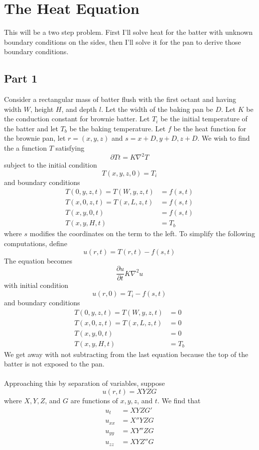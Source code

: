 \documentclass[12pt]{reedmcm}
\begin{document}
\section{The Heat Equation}
This will be a two step problem.  First I'll solve heat for the batter with unknown boundary conditions on the sides, then I'll solve it for the pan to derive those boundary conditions.

\subsection{Part 1} 
Consider a rectangular mass of batter flush with the first octant and having width $W$, height $H$, and depth $l$.  Let the width of the baking pan be $D$.  Let $K$ be the conduction constant for brownie batter.  Let $T_i$ be the initial temperature of the batter and let $T_b$ be the baking temperature.  Let $f$ be the heat function for the brownie pan, let $r = (x,y,z)$ and $s = x+D,y+D,z+D$.   We wish to find the a function $T$ satisfying
\[\partial{T}{t} = K \nabla^2 T\]
subject to the initial condition
\[T(x,y,z,0) = T_i\]
and boundary conditions \begin{align*}
T(0,y,z,t) = T(W,y,z,t) &= f(s,t)\\
T(x,0,z,t) = T(x,L,z,t) &= f(s,t)\\
T(x,y,0,t) &= f(s,t)\\
T(x,y,H,t) &= T_b \end{align*}
where $s$ modifies the coordinates on the term to the left.
To simplify the following computations, define
\[u(r,t) = T(r,t) - f(s,t)\]
The equation becomes 
\[\frac{\partial u}{\partial t} K \nabla^2 u\]
with initial condition
\[u(r,0) = T_i - f(s,t)\]
and boundary conditions \begin{align*}
T(0,y,z,t) = T(W,y,z,t) &= 0\\
T(x,0,z,t) = T(x,L,z,t) &= 0\\
T(x,y,0,t) &= 0\\
T(x,y,H,t) &= T_b\end{align*}
We get away with not subtracting from the last equation because the top of the batter is not exposed to the pan.\\
\\
Approaching this by separation of variables, suppose
\[u(r,t) = XYZG\]
where $X,Y,Z$, and $G$ are functions of $x,y,z$, and $t$.  We find that \begin{align*}
u_t &= XYZG'\\
u_{xx} &= X''YZG\\
u_{yy} &= XY''ZG\\
u_{zz} &= XYZ''G \end{align*}
\end{document}

